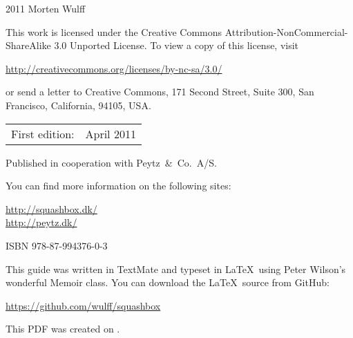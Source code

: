 \begingroup
\footnotesize
\setlength{\parindent}{0pt}
\setlength{\parskip}{\baselineskip}

\textcopyright{} 2011 Morten Wulff

This work is licensed under the Creative Commons Attribution-NonCommercial-ShareAlike 3.0 Unported License. To view a copy of this license, visit

\url{http://creativecommons.org/licenses/by-nc-sa/3.0/}

or send a letter to Creative Commons, 171 Second Street, Suite 300, San Francisco, California, 94105, USA.

\begin{center}
\begin{tabular}{ll}
First edition: & April 2011 \\
\end{tabular}
\end{center}

Published in cooperation with Peytz~\&~Co.\ A/S.

You can find more information on the following sites:

\url{http://squashbox.dk/} \\
\url{http://peytz.dk/}

\vspace{2\baselineskip}

ISBN 978-87-994376-0-3

\vspace{2\baselineskip}

This guide was written in TextMate and typeset in \LaTeX~using Peter Wilson's wonderful Memoir class. You can download the \LaTeX~source from GitHub:

\url{https://github.com/wulff/squashbox}

\vspace{2\baselineskip}

This PDF was created on \thedate.

\endgroup

\thispagestyle{empty}

\clearpage
